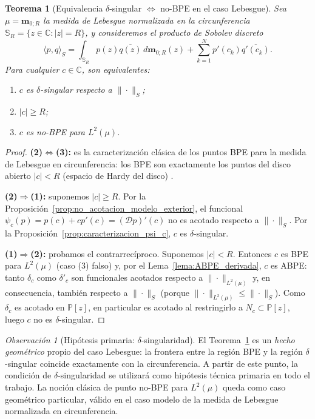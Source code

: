 \documentclass[12pt,a4paper]{article}
\newtheorem{theorem}{Teorema}
\theoremstyle{definition}
\theoremstyle{remark}
\newtheorem{remark}{Observación}
\newcommand{\C}{\mathbb{C}}
\newcommand{\Poly}{\mathbb{P}[z]}
\newcommand{\D}{\mathcal{D}}
\begin{document}
\begin{theorem}[Equivalencia $\delta$-singular $\iff$ no-BPE en el caso Lebesgue]\label{thm:equivalencia_lebesgue}
  Sea $\mu=\mathbf m_{0;R}$ la medida de Lebesgue normalizada en
  la circunferencia $\mathbb{S}_R=\{z\in\C:|z|=R\}$, y consideremos el producto
  de Sobolev discreto
  \[
    \langle p,q\rangle_S
    =
    \int_{\mathbb{S}_R}p(z)\overline{q(z)}\,d\mathbf m_{0;R}(z)
    +
    \sum_{k=1}^N p'(c_k)\overline{q'(c_k)}.
  \]
  Para cualquier $c\in\C$, son equivalentes:
  \begin{enumerate}
    \item $c$ es $\delta$-singular respecto a $\|\cdot\|_S$;
    \item $|c|\ge R$;
    \item $c$ es no-BPE para $L^2(\mu)$.
  \end{enumerate}
\end{theorem}

\begin{proof}
  \textbf{(2)$\iff$(3):} es la caracterización clásica de los puntos BPE
  para la medida de Lebesgue en circunferencia: los BPE son exactamente
  los puntos del disco abierto $|c|<R$ (espacio de Hardy del disco)
  \cite{duren1970theory,szego1975orthogonal}.

  \textbf{(2)$\Rightarrow$(1):} suponemos $|c|\ge R$.
  Por la Proposición~\ref{prop:no_acotacion_modelo_exterior},
  el funcional $\psi_c(p)=p(c)+cp'(c)=(\D p)'(c)$ no es acotado
  respecto a $\|\cdot\|_S$. Por la
  Proposición~\ref{prop:caracterizacion_psi_c}, $c$ es $\delta$-singular.

  \textbf{(1)$\Rightarrow$(2):} probamos el contrarrecíproco.
  Suponemos $|c|<R$. Entonces $c$ es BPE para $L^2(\mu)$ (caso (3)
  falso) y, por el Lema~\ref{lema:ABPE_derivada}, $c$ es ABPE: tanto $\delta_c$
  como $\delta'_c$ son funcionales acotados respecto a $\|\cdot\|_{L^2(\mu)}$
  y, en consecuencia, también respecto a $\|\cdot\|_S$ (porque
  $\|\cdot\|_{L^2(\mu)}\le\|\cdot\|_S$). Como $\delta_c$ es acotado en
  $\Poly$, en particular es acotado al restringirlo a $N_c\subset\Poly$,
  luego $c$ no es $\delta$-singular.
\end{proof}

\begin{remark}[Hipótesis primaria: $\delta$-singularidad]\label{rem:hipotesis_delta_singular}
  El Teorema~\ref{thm:equivalencia_lebesgue} es un \emph{hecho geométrico}
  propio del caso Lebesgue: la frontera entre la región BPE y la región
  $\delta$-singular coincide exactamente con la circunferencia.
  A partir de este punto, la condición de $\delta$-singularidad se utilizará
  como hipótesis técnica primaria en todo el trabajo. La noción clásica
  de punto no-BPE para $L^2(\mu)$ queda como caso geométrico particular,
  válido en el caso modelo de la medida de Lebesgue normalizada en circunferencia.
\end{remark}
\end{document}
